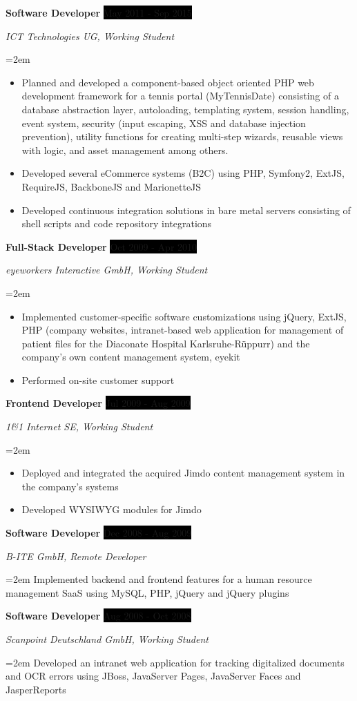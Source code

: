 \documentclass[paper=a4,fontsize=11pt]{scrartcl} %
\newcommand{\sepspace}{\vspace*{1em}}		%
\newcommand{\EducationEntry}[4]{
		\noindent \textbf{#1} \hfill      %
		\colorbox{Black}{%
			\parbox{6em}{%
			\hfill\color{White}#2}} \par  %
		\noindent \textit{#3} \par        %
		\noindent\hangindent=2em\hangafter=0 \small #4 %
		\normalsize \par}
\newcommand{\WorkEntry}[4]{				  %
		\noindent \textbf{#1} \hfill      %
		\colorbox{Black}{\color{White}#2} \par  %
		\noindent \textit{#3} \par              %
		\noindent\hangindent=2em\hangafter=0 \small #4 %
		\normalsize \par}
\begin{document}
\WorkEntry{Software Developer}{May 2011 - Sep 2015}{ICT Technologies UG, Working Student}{
\begin{itemize}
    \item Planned and developed a component-based object oriented PHP web development framework for a tennis portal (MyTennisDate) consisting of a database abstraction layer, autoloading, templating system, session handling, event system, security (input escaping, XSS and database injection prevention), utility functions for creating multi-step wizards, reusable views with logic, and asset management among others.
    \item Developed several eCommerce systems (B2C) using PHP, Symfony2, ExtJS, RequireJS, BackboneJS and MarionetteJS
    \item Developed continuous integration solutions in bare metal servers consisting of shell scripts and code repository integrations
\end{itemize}}
\sepspace

\WorkEntry{Full-Stack Developer}{Oct 2009 - Apr 2010}{eyeworkers Interactive GmbH, Working Student}{
\begin{itemize}
    \item Implemented customer-specific software customizations using jQuery, ExtJS, PHP (company websites, intranet-based web application for management of patient files for the Diaconate Hospital Karlsruhe-Rüppurr) and the company's own content management system, eyekit
    \item Performed on-site customer support
\end{itemize}}
\sepspace

\WorkEntry{Frontend Developer}{Jul 2009 - Aug 2009}{1\&1 Internet SE, Working Student}{
\begin{itemize}
    \item Deployed and integrated the acquired Jimdo content management system in the company's systems
    \item Developed WYSIWYG modules for Jimdo
\end{itemize}}
\sepspace

\WorkEntry{Software Developer}{Dec 2008 - Aug 2009}{B-ITE GmbH, Remote Developer}{Implemented backend and frontend features for a human resource management SaaS using MySQL, PHP, jQuery and jQuery plugins}
\sepspace

\WorkEntry{Software Developer}{Aug 2008 - Oct 2008}{Scanpoint Deutschland GmbH, Working Student}{Developed an intranet web application for tracking digitalized documents and OCR errors using JBoss, JavaServer Pages, JavaServer Faces and JasperReports}
\sepspace
\end{document}
